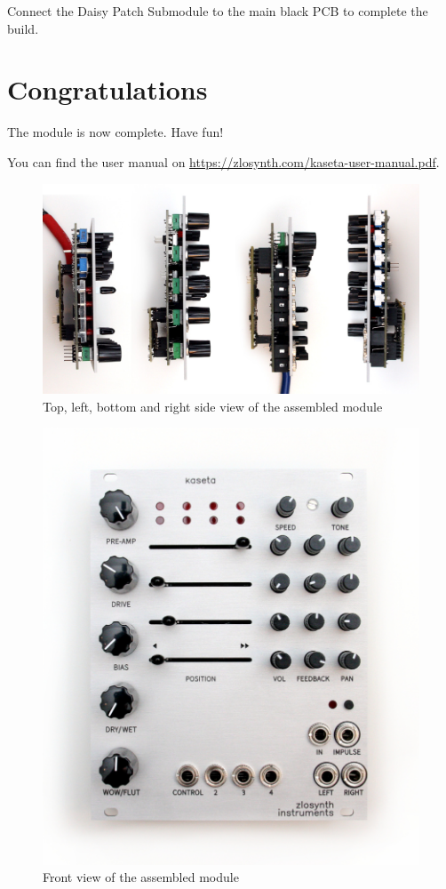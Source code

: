 \documentclass[10pt,a4paper,twocolumn]{article}
\begin{document}
Connect the Daisy Patch Submodule to the main black PCB to complete the build.

\section{Congratulations}

The module is now complete. Have fun!

You can find the user manual on \url{https://zlosynth.com/kaseta-user-manual.pdf}.

\vspace{2cm}

\begin{figure}[h]
  \centering
  \includegraphics[width=\linewidth]{p06.jpg}
  \caption{\centering Top, left, bottom and right side view of the assembled module}
\end{figure}

\begin{figure}[h]
  \centering
  \includegraphics[width=\linewidth]{p07.jpg}
  \caption{Front view of the assembled module}
\end{figure}
\end{document}
